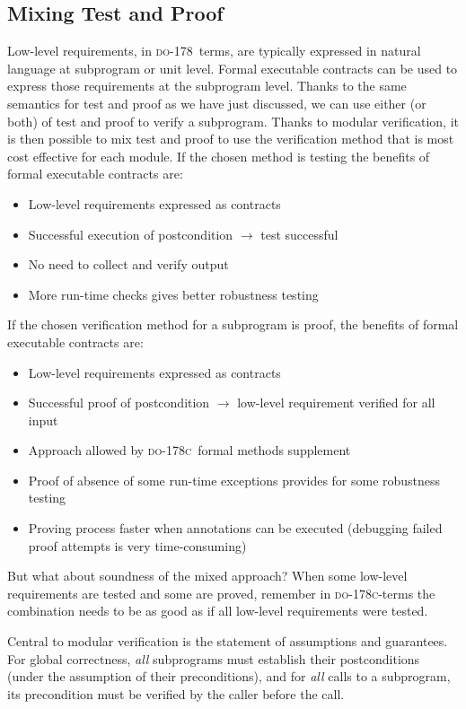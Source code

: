 \documentclass[sttt,draft]{svjour}
\newcommand{\DO}{\textsc{do-178}}
\newcommand{\DOC}{\textsc{do-178c}}
\begin{document}
\subsection{Mixing Test and Proof}

Low-level requirements, in \DO\ terms, are typically expressed in
natural language at subprogram or unit level. Formal executable
contracts can be used to express those requirements at the
subprogram level. Thanks to the same semantics for test and proof as
we have just discussed, we can use either (or both) of test and proof
to verify a subprogram. Thanks to modular verification, it is then
possible to mix test and proof to use the verification method that is
most cost effective for each module. If the chosen method is testing
the benefits of formal executable contracts are:
\begin{itemize}
\item Low-level requirements expressed as contracts
\item Successful execution of postcondition $\rightarrow$ test successful
\item No need to collect and verify output
\item More run-time checks gives better robustness testing
\end{itemize}
If the chosen verification method for a subprogram is proof, the
benefits of formal executable contracts are:
\begin{itemize}
\item Low-level requirements expressed as contracts
\item Successful proof of postcondition $\rightarrow$ low-level
  requirement verified for all input
\item Approach allowed by \DOC\ formal methods supplement
\item Proof of absence of some run-time exceptions provides for some
  robustness testing
\item Proving process faster when annotations can be executed (debugging failed proof attempts is very time-consuming)
\end{itemize}

But what about soundness of the mixed approach? When some low-level
requirements are tested and some are proved, remember in
\DOC-terms the combination needs to be as good as if all low-level
requirements were tested.

Central to modular verification is the statement of assumptions and
guarantees. For global correctness, \emph{all} subprograms must
establish their postconditions (under the assumption of their
preconditions), and for \emph{all} calls to a subprogram, its
precondition must be verified by the caller before the call.
\end{document}
